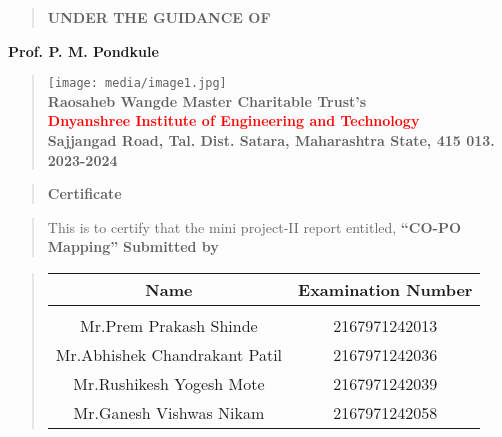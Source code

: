 \documentclass[12pt]{report}
\begin{document}
	\vspace{0.5cm}
	\begin{quote}
		\centering
		\large
		\textbf{UNDER THE GUIDANCE OF}
	\end{quote}
	\textbf{Prof. P. M. Pondkule}
	\vspace{0.5cm}
	\begin{quote}
		\centering
		\texttt{[image: media/image1.jpg]}\\
		\vspace{0.5cm}
		\bfseries
		\textbf{Raosaheb Wangde Master Charitable Trust's}\\
		\textcolor{red}{Dnyanshree Institute of Engineering and Technology}\\
		Sajjangad Road, Tal. Dist. Satara, Maharashtra State, 415 013.\\ 2023-2024
	\end{quote}
	\vspace{0.5cm}
	
	\newpage
	
	
	
	
	\begin{quote}
		\centering
		\LARGE
		\textbf{Certificate}
	\end{quote}
	
	\begin{quote}
		\normalsize
		\centering
		This is to certify that the mini project-II report entitled, \textbf{``CO-PO Mapping''}
		\textbf{Submitted by}\\[3ex]
	\end{quote}
	
	\begin{quote}
		
		\begin{table}[ht]
			\centering
			\begin{tabular}{ c  c }
				
				\bfseries
				Name & \bfseries Examination Number \\[2ex]
				\hline \\[1ex]
				
				\hspace{-2ex}Mr.Prem Prakash Shinde & 2167971242013\\[1ex]
				\hspace{5ex}Mr.Abhishek Chandrakant Patil & 2167971242036\\[1ex]
				Mr.Rushikesh Yogesh Mote & 2167971242039\\[1ex]
				Mr.Ganesh Vishwas Nikam & 2167971242058\\[1ex]
				
			\end{tabular}
		\end{table}
	\end{quote}
	
\end{document}
